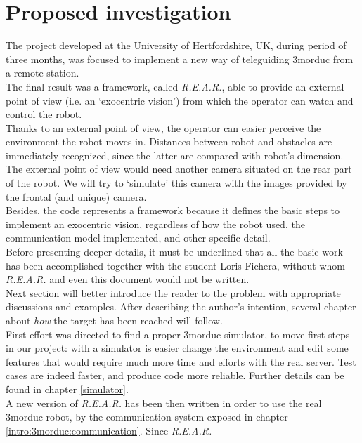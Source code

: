 \section{Proposed investigation}
\label{intro:proposed_investigation}

The project developed at the University of Hertfordshire,
UK, during period of three months, was focused to implement
a new way of teleguiding 3morduc from a remote station.
\\
The final result was a framework, called \textit{R.E.A.R.},
able to provide an external point of view (i.e. an `exocentric
vision') from which the operator
can watch and control the robot.
\\
Thanks to an external point of view, the operator can easier
perceive the environment the robot moves in. Distances between
robot and obstacles are immediately recognized, since the latter
are compared with robot's dimension.
\\
The external point of view would need another camera situated
on the rear part of the robot. We will try to `simulate' this
camera with the images provided by the frontal (and unique)
camera.
\\
Besides, the code represents a framework because it defines the basic
steps to implement an exocentric vision, regardless of how the
robot used, the communication model implemented, and other
specific detail.
\\
Before presenting deeper details, it must be underlined that
all the basic work has been accomplished together with the
student Loris Fichera, without whom \textit{R.E.A.R.} and even
this document would not be written.
\\
Next section will better introduce the reader to the problem with
appropriate discussions and examples. After describing
the author's intention, several chapter about \textit{how} the
target has been reached will follow.
\\
First effort was directed to find a proper 3morduc simulator,
to move first steps in our project: with a simulator is easier
change the environment and edit some features that would require
much more time and efforts with the real server. Test cases are
indeed faster, and produce code more reliable. Further details
can be found in chapter \ref{simulator}.
\\
A new version of \textit{R.E.A.R.} has been then written in order
to use the real 3morduc robot, by the communication system exposed
in chapter \ref{intro:3morduc:communication}. Since \textit{R.E.A.R.}
